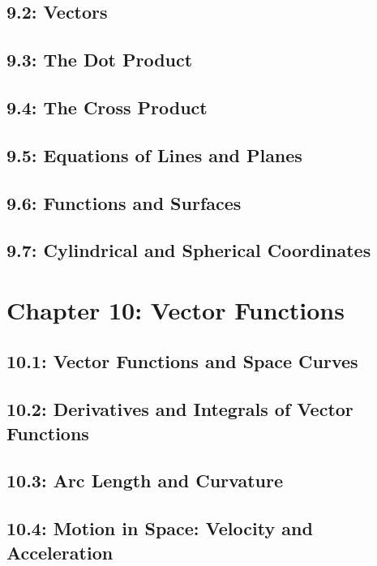 \documentclass[12pt]{amsart}
\begin{document}
\subsection{9.2: Vectors}

\newpage
\subsection{9.3: The Dot Product}

\newpage
\subsection{9.4: The Cross Product}

\newpage
\subsection{9.5: Equations of Lines and Planes}

\newpage
\subsection{9.6: Functions and Surfaces}

\newpage
\subsection{9.7: Cylindrical and Spherical Coordinates}

\newpage
\section{Chapter 10: Vector Functions}


\subsection{10.1: Vector Functions and Space Curves}

\newpage
\subsection{10.2: Derivatives and Integrals of Vector Functions}

\newpage
\subsection{10.3: Arc Length and Curvature}

\newpage
\subsection{10.4: Motion in Space: Velocity and Acceleration}
\end{document}
